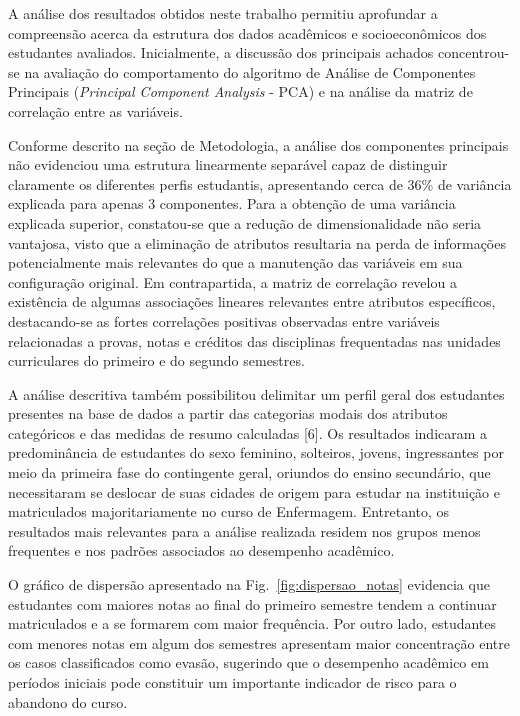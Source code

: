 A análise dos resultados obtidos neste trabalho permitiu aprofundar a compreensão acerca da estrutura dos dados acadêmicos e socioeconômicos dos estudantes avaliados. Inicialmente, a discussão dos principais achados concentrou-se na avaliação do comportamento do algoritmo de Análise de Componentes Principais (\textit{Principal Component Analysis} - PCA) e na análise da matriz de correlação entre as variáveis. 

Conforme descrito na seção de Metodologia, a análise dos componentes principais não evidenciou uma estrutura linearmente separável capaz de distinguir claramente os diferentes perfis estudantis, apresentando cerca de 36\% de variância explicada para apenas 3 componentes. Para a obtenção de uma variância explicada superior, constatou-se que a redução de dimensionalidade não seria vantajosa, visto que a eliminação de atributos resultaria na perda de informações potencialmente mais relevantes do que a manutenção das variáveis em sua configuração original. Em contrapartida, a matriz de correlação revelou a existência de algumas associações lineares relevantes entre atributos específicos, destacando-se as fortes correlações positivas observadas entre variáveis relacionadas a provas, notas e créditos das disciplinas frequentadas nas unidades curriculares do primeiro e do segundo semestres.

A análise descritiva também possibilitou delimitar um perfil geral dos estudantes presentes na base de dados a partir das categorias modais dos atributos categóricos e das medidas de resumo calculadas [6]. Os resultados indicaram a predominância de estudantes do sexo feminino, solteiros, jovens, ingressantes por meio da primeira fase do contingente geral, oriundos do ensino secundário, que necessitaram se deslocar de suas cidades de origem para estudar na instituição e matriculados majoritariamente no curso de Enfermagem. Entretanto, os resultados mais relevantes para a análise realizada residem nos grupos menos frequentes e nos padrões associados ao desempenho acadêmico.

O gráfico de dispersão apresentado na Fig.~\ref{fig:dispersao_notas} evidencia que estudantes com maiores notas ao final do primeiro semestre tendem a continuar matriculados e a se formarem com maior frequência. Por outro lado, estudantes com menores notas em algum dos semestres apresentam maior concentração entre os casos classificados como evasão, sugerindo que o desempenho acadêmico em períodos iniciais pode constituir um importante indicador de risco para o abandono do curso.

